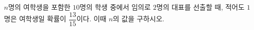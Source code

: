 $n$명의 여학생을 포함한 $10$명의 학생 중에서 임의로 $2$명의 대표를 선출할 때, 적어도 $1$명은 여학생일 확률이 $\dfrac{13}{15}$이다. 이때 $n$의 값을 구하시오.
